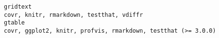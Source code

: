 \documentclass[
  letterpaper,
  DIV=11,
  numbers=noendperiod]{scrreprt}
\begin{document}
\begin{verbatim}
gridtext                                                                                                                                                                                                                                                                                                                                                                                                                                                                                                                                                                                                                                                                                                                                                                                                                                                                                                                                                                                                                                                                                                                                                                                                                                                             covr, knitr, rmarkdown, testthat, vdiffr
gtable                                                                                                                                                                                                                                                                                                                                                                                                                                                                                                                                                                                                                                                                                                                                                                                                                                                                                                                                                                                                                                                                                                                                                                                                                                          covr, ggplot2, knitr, profvis, rmarkdown, testthat (>= 3.0.0)

\end{verbatim}
\end{document}
